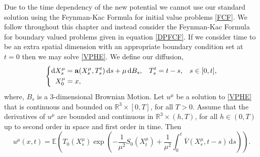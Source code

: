 \documentclass[a4paper,12pt,draft]{report}
\begin{document}
Due to the time dependency of the new potential we cannot use our standard solution using the Feynman-Kac Formula for initial value problems \eqref{FCF}.  We follow \cite{ANSRAT} throughout this chapter and instead consider the Feynman-Kac Formula for boundary valued problems given in equation \eqref{DPFCF}.  If we consider time to be an extra spatial dimension with an appropriate boundary condition set at $t = 0$ then we may solve \eqref{VPHE}.  We define our diffusion,
$$
\left\{
\begin{aligned}
& \mathrm{d}X_s^\mu = \mathbf{a}(X_s^\mu, T_s^t)\,\mathrm{d}s + \mu\,\mathrm{d}B_s, \hspace{0.3cm} T_s^t = t - s, \hspace{0.3cm} s \in [0, t],\\
& \hspace{0.2cm} X_0^\mu = x,
\end{aligned}
\right.
$$
where, $B_s$ is a 3-dimensional Brownian Motion.
\theorem
{
Let $u^\mu$ be a solution to \eqref{VPHE} that is continuous and bounded on $\mathbb{R}^3 \times [0, T]$, for all $T > 0$.  Assume that the derivatives of $u^\mu$ are bounded and continuous in $\mathbb{R}^3 \times (h, T)$, for all $h \in (0, T)$ up to second order in space and first order in time. Then
\begin{equation}
u^\mu(x, t) = \mathbb{E}\left(T_0(X_s^\mu)\exp\left(-\frac{1}{\mu^2}S_0(X_t^\mu) + \frac{1}{\mu^2}\int_0^t\bar{V}(X_s^\mu, t - s)\,\mathrm{d}s\right)\right). \label{FCF2}
\end{equation}
}
\proof
\end{document}
